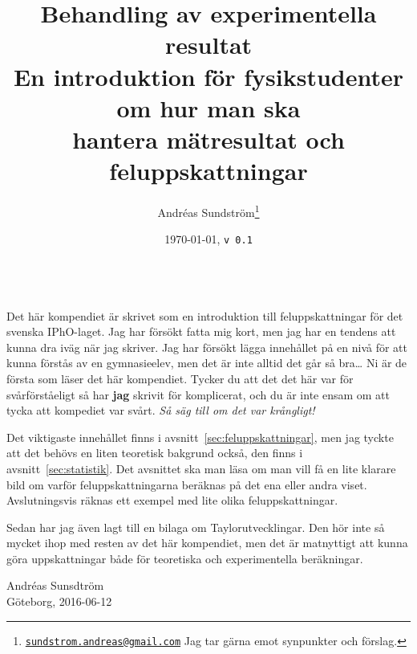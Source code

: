 \documentclass[11pt,a4paper, english, swedish
]{article}
\begin{document}
\title{\huge Behandling av experimentella resultat\\[2mm] 
\Large En introduktion för fysikstudenter om hur man ska\\ hantera
mätresultat och feluppskattningar}
\author{
Andréas Sundström\footnote{
\href{mailto:sundstrom.andreas@gmail.com}{\nolinkurl{sundstrom.andreas@gmail.com}}
\: Jag tar gärna emot synpunkter och förslag.}
}
\date{\today, \quad\texttt{v\,0.1}}
\maketitle



\\[1mm]
\small
Det här kompendiet är skrivet som en introduktion till
feluppskattningar för det svenska IPhO-laget. Jag har försökt fatta
mig kort, men jag har en tendens att kunna dra iväg när jag
skriver. Jag har försökt lägga innehållet på en nivå för att kunna
förstås av en gymnasieelev, men det är inte alltid det går så
bra\ldots{} Ni är de första som läser det här kompendiet. Tycker du
att det det här var för svårförståeligt så har \textbf{jag} skrivit
för komplicerat, och du är inte ensam om att tycka att kompediet var
svårt. \emph{Så säg till om det var krångligt!} 

Det viktigaste innehållet finns i avsnitt~\ref{sec:feluppskattningar},
men jag tyckte att det behövs en liten teoretisk bakgrund också, den
finns i avsnitt~\ref{sec:statistik}. Det avsnittet ska man läsa om man
vill få en lite klarare bild om varför feluppskattningarna beräknas på
det ena eller andra viset. Avslutningsvis räknas ett exempel med lite
olika feluppskattningar.

Sedan har jag även lagt till en bilaga om
Taylorutvecklingar. Den hör inte så mycket ihop med resten av det här
kompendiet, men det är matnyttigt att kunna göra uppskattningar både
för teoretiska och experimentella beräkningar.  

\begin{flushright}
Andréas Sunsdtröm\\ 
Göteborg, 2016-06-12
\end{flushright}
\normalsize



\clearpage
\tableofcontents
\clearpage
\end{document}
